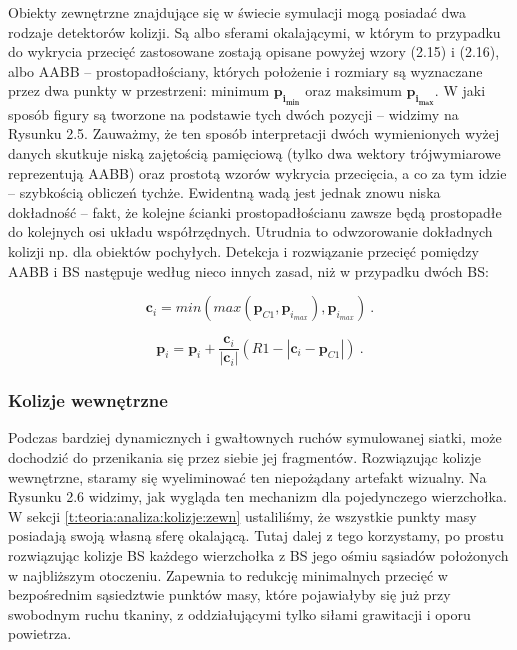 				
				Obiekty zewnętrzne znajdujące się w świecie symulacji mogą posiadać dwa rodzaje detektorów kolizji. Są albo sferami okalającymi, w którym to przypadku do wykrycia przecięć zastosowane zostają opisane powyżej wzory (2.15) i (2.16), albo AABB -- prostopadłościany, których położenie i rozmiary są wyznaczane przez dwa punkty w przestrzeni: minimum \(\mathbf{p_{i_{min}}}\) oraz maksimum \(\mathbf{p_{i_{max}}}\). W jaki sposób figury są tworzone na podstawie tych dwóch pozycji -- widzimy na Rysunku 2.5. Zauważmy, że ten sposób interpretacji dwóch wymienionych wyżej danych skutkuje niską zajętością pamięciową (tylko dwa wektory trójwymiarowe reprezentują AABB) oraz prostotą wzorów wykrycia przecięcia, a co za tym idzie -- szybkością obliczeń tychże. Ewidentną wadą jest jednak znowu niska dokładność -- fakt, że kolejne ścianki prostopadłościanu zawsze będą prostopadłe do kolejnych osi układu współrzędnych. Utrudnia to odwzorowanie dokładnych kolizji np. dla obiektów pochyłych. Detekcja i rozwiązanie przecięć pomiędzy AABB i BS następuje według nieco innych zasad, niż w przypadku dwóch BS:
				
				\begin{equation}
				\mathbf{c}_{i} =  min(max(\mathbf{p}_{C1}, \mathbf{p}_{i_{max}}), \mathbf{p}_{i_{max}})  \ .
				\end{equation}
				
				\begin{equation}
				\mathbf{p}_{i} = \mathbf{p}_{i} + \frac{\mathbf{c}_{i}}{|\mathbf{c}_{i}|}(R1 - |\mathbf{c}_{i} - \mathbf{p}_{C1}|) \ .
				\end{equation}
			
			\subsubsection{Kolizje wewnętrzne}
			\label{t:teoria:analiza:kolizje:wewn}
			
				
				Podczas bardziej dynamicznych i gwałtownych ruchów symulowanej siatki, może dochodzić do przenikania się przez siebie jej fragmentów. Rozwiązując kolizje wewnętrzne, staramy się wyeliminować ten niepożądany artefakt wizualny. Na Rysunku 2.6 widzimy, jak wygląda ten mechanizm dla pojedynczego wierzchołka. W sekcji \ref{t:teoria:analiza:kolizje:zewn} ustaliliśmy, że wszystkie punkty masy posiadają swoją własną sferę okalającą. Tutaj dalej z tego korzystamy, po prostu rozwiązując kolizje BS każdego wierzchołka z BS jego ośmiu sąsiadów położonych w najbliższym otoczeniu. Zapewnia to redukcję minimalnych przecięć w bezpośrednim sąsiedztwie punktów masy, które pojawiałyby się już przy swobodnym ruchu tkaniny, z oddziałującymi tylko siłami grawitacji i oporu powietrza.
				
